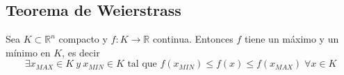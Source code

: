 \documentclass[11pt]{article}
\newcommand{\R}{\mathbb{R}}
\theoremstyle{plain}
\begin{document}
        \subsection{Teorema de Weierstrass} %
        \label{sub:teorema_de_weierstrass}
            Sea $K\subset \R^n$ compacto y $f:K\rightarrow \R$ continua. Entonces $f$ tiene un máximo y un mínimo en $K$, es decir
            \begin{equation}
                 \exists x_{MAX} \in K \ y \ x_{MIN} \in K \text{ tal que } f(x_{MIN})\le f(x) \le f(x_{MAX}) \; \forall x \in K
             \end{equation} 
        


\end{document}
